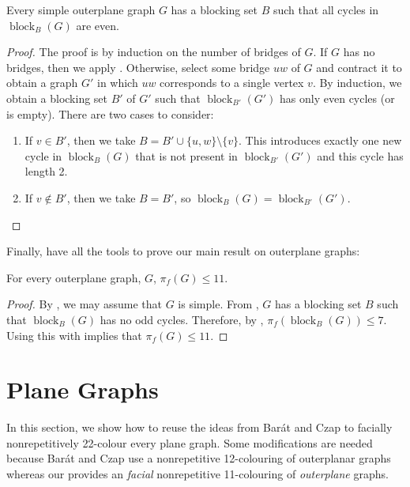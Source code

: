 \documentclass{patmorin}
\DeclareMathOperator{\block}{block}
\begin{document}
\begin{lem}
  Every simple outerplane graph $G$ has a blocking set $B$ such that
  all cycles in $\block_B(G)$ are even.
\end{lem}

\begin{proof}
  The proof is by induction on the number of bridges of $G$.  If $G$
  has no bridges, then we apply .  Otherwise,
  select some bridge $uw$ of $G$ and contract it to obtain a graph $G'$
  in which $uw$ corresponds to a single vertex $v$.  By induction,
  we obtain a blocking set $B'$ of $G'$ such that $\block_{B'}(G')$
  has only even cycles (or is empty).  There are two cases to consider:
  \begin{enumerate}
    \item If $v\in B'$, then we take $B=B'\cup\{u,w\}\setminus\{v\}$. This introduces exactly one new cycle in $\block_B(G)$ that is not present in $\block_{B'}(G')$ and this cycle has length 2.

    \item If $v\not\in B'$, then we take $B=B'$, so
    $\block_B(G)=\block_{B'}(G')$. \qedhere
  \end{enumerate}
\end{proof}

Finally, have all the tools to prove our main result on outerplane graphs:

\begin{thm}
  For every outerplane graph, $G$, $\pi_f(G)\le 11$.
\end{thm}

\begin{proof}
By , we may assume that $G$ is simple.  From
, $G$ has a blocking set $B$ such that $\block_B(G)$
has no odd cycles.  Therefore, by , $\pi_f(\block_B(G))\le
7$.  Using this with  implies that $\pi_f(G)\le 11$.
\end{proof}



\section{Plane Graphs}

In this section, we show how to reuse the ideas from Bar\'at and Czap
\cite{barat2013facial} to facially nonrepetitively 22-colour every plane graph.
Some modifications are needed because Bar\'at and Czap use a nonrepetitive
12-colouring of outerplanar graphs whereas our  provides an
\emph{facial} nonrepetitive 11-colouring of \emph{outerplane} graphs.
\end{document}
